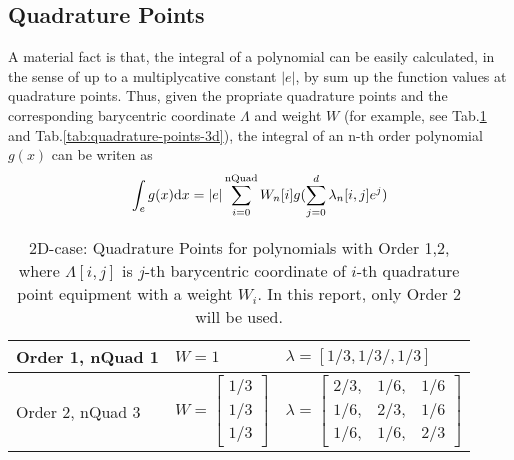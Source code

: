 \subsection{Quadrature Points}
A material fact is that, the integral of a polynomial can be easily calculated, 
in the sense of up to a multiplycative constant $|e|$,
by sum up the function values at quadrature points\cite{chen2008ifem}.
Thus, given the propriate quadrature points and the corresponding 
barycentric coordinate $\Lambda$ and weight $W$
(for example, see Tab.\ref{tab:quadrature-points-2d} and Tab.\ref{tab:quadrature-points-3d}),
the integral of an n-th order polynomial $g(x)$ can be writen as 
\begin{equation}\label{eq:quadrature-points-integral}
  \int_e g(x)\mathrm{d} x=|e|\sum_{i=0}^{\text{nQuad}}W_n[i]g(\sum_{j=0}^{d}\lambda_n[i,j]e^j)
\end{equation}
\begin{table}[ht]
  \centering
  \caption{2D-case: Quadrature Points for polynomials with Order 1,2, 
  where $\Lambda[i,j]$ is $j$-th barycentric coordinate of $i$-th quadrature point equipment with a weight $W_i$. 
  In this report, only Order 2 will be used.}
  \label{tab:quadrature-points-2d}
  \begin{tabular}{l|l|l}
    \hline
    Order 1, nQuad 1
    & $W=1$
    & $\lambda=[1/3,1/3/,1/3]$ \\
    \hline
    Order 2, nQuad 3 
    & $W=\left[
      \begin{array}{c}
        1/3 \\
        1/3 \\
        1/3
      \end{array}\right]$
    & $\lambda=\left[
      \begin{array}{ccc}
        2/3, & 1/6, & 1/6 \\
        1/6, & 2/3, & 1/6 \\
        1/6, & 1/6, & 2/3
      \end{array}
      \right]$ \\
    \hline
  \end{tabular}
\end{table}
